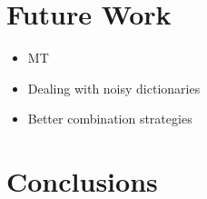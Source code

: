 \documentclass{article}
\begin{document}
\newpage

\newpage

\section{Future Work}

\begin{itemize}
  \item MT
  \item Dealing with noisy dictionaries
  \item Better combination strategies
\end{itemize}

\section{Conclusions}



 
\end{document}
